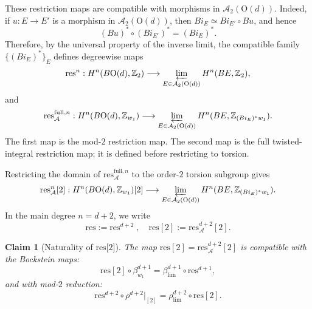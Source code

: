 \documentclass[aps,prx,reprint,superscriptaddress,twocolumn,amsmath,amssymb,amsfonts, nofootinbib]{revtex4-2}
\newcommand{\res}{\text{res}}
\newcommand{\Z}{\mathbb{Z}}
\theoremstyle{apsstyle}
\newtheorem{claim}{Claim}
\begin{document}
These restriction maps are compatible with morphisms in $\mathcal A_2(\mathrm{O}(d))$. Indeed, if
$u:E\to E'$ is a morphism in $\mathcal A_2(\mathrm{O}(d))$, then
$Bi_E\simeq Bi_{E'}\circ Bu$, and hence
\begin{equation}
(Bu)^*\circ (Bi_{E'})^*=(Bi_E)^*.
\end{equation}
Therefore, by the universal property of the inverse limit, the compatible family
$\{(Bi_E)^*\}_E$ defines degreewise maps
\begin{equation}
\res^n:
H^n(B\mathrm{O}(d),\Z_2)
\longrightarrow
\varprojlim_{E\in\mathcal A_2(\mathrm{O}(d))}
H^n(BE,\Z_2),
\end{equation}
and
\begin{equation}
\res_{\mathcal A}^{\mathrm{full},n}:
H^n(B\mathrm{O}(d),\Z_{w_1})
\longrightarrow
\varprojlim_{E\in\mathcal A_2(\mathrm{O}(d))}
H^n(BE,\Z_{(Bi_E)^*w_1}).
\label{eq:res_full}
\end{equation}
The first map is the mod-$2$ restriction map. The second map is the full twisted-integral restriction map; it is defined before restricting to torsion.

Restricting the domain of $\res_{\mathcal A}^{\mathrm{full},n}$ to the order-$2$ torsion subgroup gives
\begin{equation}
\res_{\mathcal A}^{n}[2]:
H^n(B\mathrm{O}(d),\Z_{w_1})[2]
\longrightarrow
\varprojlim_{E\in\mathcal A_2(\mathrm{O}(d))}
H^n(BE,\Z_{(Bi_E)^*w_1}).
\label{eq:res_tor}
\end{equation}
In the main degree $n=d+2$, we write
\begin{equation}
\res:=\res^{d+2}\;,\quad \res[2]:=\res_{\mathcal A}^{d+2}[2].
\end{equation}

\bigskip 

\begin{claim}[Naturality of $\res\text{[}2\text{]}$]
\label{claim:res2_exists_natural}
The map $\res[2]=\res_{\mathcal A}^{d+2}[2]$ is compatible with the Bockstein maps: \begin{equation} \res[2]\circ \beta_{w_1}^{d+1} = \beta_{\lim}^{d+1}\circ \res^{d+1}, \end{equation} and with mod-$2$ reduction: \begin{equation} \res^{d+2}\circ \rho^{d+2}\vert_{[2]} = \rho_{\lim}^{d+2}\circ \res[2]. \end{equation}
\end{claim}
\end{document}
